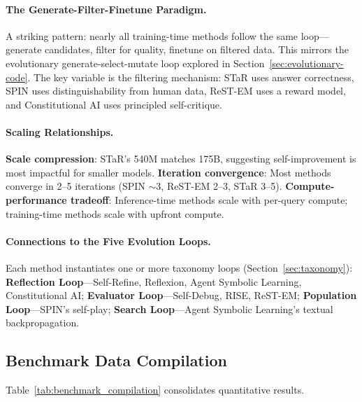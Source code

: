 \paragraph{The Generate-Filter-Finetune Paradigm.}
A striking pattern: nearly all training-time methods follow the same loop---generate candidates, filter for quality, finetune on filtered data. This mirrors the evolutionary generate-select-mutate loop explored in Section~\ref{sec:evolutionary-code}. The key variable is the filtering mechanism: STaR uses answer correctness, SPIN uses distinguishability from human data, ReST-EM uses a reward model, and Constitutional AI uses principled self-critique.

\paragraph{Scaling Relationships.}
\textbf{Scale compression}: STaR's 540M matches 175B, suggesting self-improvement is most impactful for smaller models. \textbf{Iteration convergence}: Most methods converge in 2--5 iterations (SPIN $\sim$3, ReST-EM 2--3, STaR 3--5). \textbf{Compute-performance tradeoff}: Inference-time methods scale with per-query compute; training-time methods scale with upfront compute.

\paragraph{Connections to the Five Evolution Loops.}
Each method instantiates one or more taxonomy loops (Section~\ref{sec:taxonomy}): \textbf{Reflection Loop}---Self-Refine, Reflexion, Agent Symbolic Learning, Constitutional AI; \textbf{Evaluator Loop}---Self-Debug, RISE, ReST-EM; \textbf{Population Loop}---SPIN's self-play; \textbf{Search Loop}---Agent Symbolic Learning's textual backpropagation.

\subsection{Benchmark Data Compilation}
\label{sec:benchmark-compilation}

Table~\ref{tab:benchmark_compilation} consolidates quantitative results.

